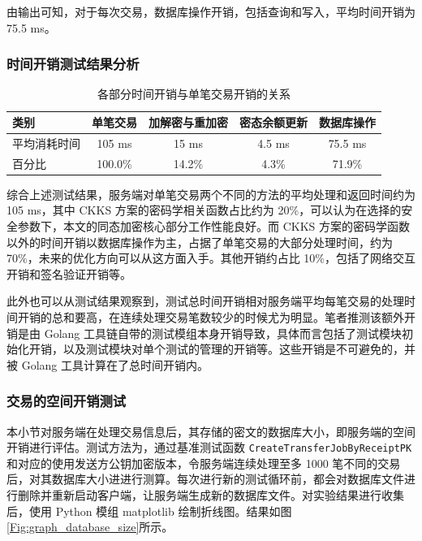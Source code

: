 由输出可知，对于每次交易，数据库操作开销，包括查询和写入，平均时间开销为 75.5 ms。

\subsubsection{时间开销测试结果分析}

\begin{table}[h]
    \begin{tabular}{|l|c|c|c|c|}
        \hline
        类别 & 单笔交易 & 加解密与重加密 & 密态余额更新 & 数据库操作 \\
        \hline
        平均消耗时间 & 105 ms & 15 ms & 4.5 ms & 75.5 ms \\ 
        \hline
        百分比 & 100.0\% & 14.2\% & 4.3\% & 71.9\% \\
        \hline
    \end{tabular}
    \caption{各部分时间开销与单笔交易开销的关系} \label{Tab:time_comsumption}
\end{table}

综合上述测试结果，服务端对单笔交易两个不同的方法的平均处理和返回时间约为 105 ms，其中 CKKS 方案的密码学相关函数占比约为 20\%，可以认为在选择的安全参数下，本文的同态加密核心部分工作性能良好。而 CKKS 方案的密码学函数以外的时间开销以数据库操作为主，占据了单笔交易的大部分处理时间，约为 70\%，未来的优化方向可以从这方面入手。其他开销约占比 10\%，包括了网络交互开销和签名验证开销等。

此外也可以从测试结果观察到，测试总时间开销相对服务端平均每笔交易的处理时间开销的总和要高，在连续处理交易笔数较少的时候尤为明显。笔者推测该额外开销是由 Golang 工具链自带的测试模组本身开销导致，具体而言包括了测试模块初始化开销，以及测试模块对单个测试的管理的开销等。这些开销是不可避免的，并被 Golang 工具计算在了总时间开销内。

\subsubsection{交易的空间开销测试} \label{Sec:Mem_cost}

本小节对服务端在处理交易信息后，其存储的密文的数据库大小，即服务端的空间开销进行评估。测试方法为，通过基准测试函数 \verb|CreateTransferJobByReceiptPK| 和对应的使用发送方公钥加密版本，令服务端连续处理至多 1000 笔不同的交易后，对其数据库大小进进行测算。每次进行新的测试循环前，都会对数据库文件进行删除并重新启动客户端，让服务端生成新的数据库文件。对实验结果进行收集后，使用 Python 模组 matplotlib 绘制折线图。结果如图\ref{Fig:graph_database_size}所示。


